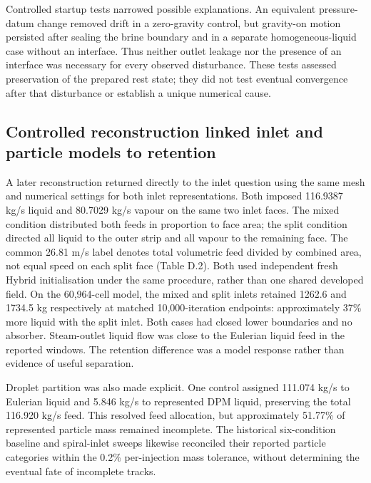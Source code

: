 Controlled startup tests narrowed possible explanations. An equivalent pressure-datum change removed drift in a zero-gravity control, but gravity-on motion persisted after sealing the brine boundary and in a separate homogeneous-liquid case without an interface. Thus neither outlet leakage nor the presence of an interface was necessary for every observed disturbance. These tests assessed preservation of the prepared rest state; they did not test eventual convergence after that disturbance or establish a unique numerical cause.

\subsection{Controlled reconstruction linked inlet and particle models to retention}

A later reconstruction returned directly to the inlet question using the same mesh and numerical settings for both inlet representations. Both imposed 116.9387 kg/s liquid and 80.7029 kg/s vapour on the same two inlet faces. The mixed condition distributed both feeds in proportion to face area; the split condition directed all liquid to the outer strip and all vapour to the remaining face. The common 26.81 m/s label denotes total volumetric feed divided by combined area, not equal speed on each split face (Table D.2). Both used independent fresh Hybrid initialisation under the same procedure, rather than one shared developed field. On the 60,964-cell model, the mixed and split inlets retained 1262.6 and 1734.5 kg respectively at matched 10,000-iteration endpoints: approximately 37\% more liquid with the split inlet. Both cases had closed lower boundaries and no absorber. Steam-outlet liquid flow was close to the Eulerian liquid feed in the reported windows. The retention difference was a model response rather than evidence of useful separation.

Droplet partition was also made explicit. One control assigned 111.074 kg/s to Eulerian liquid and 5.846 kg/s to represented DPM liquid, preserving the total 116.920 kg/s feed. This resolved feed allocation, but approximately 51.77\% of represented particle mass remained incomplete. The historical six-condition baseline and spiral-inlet sweeps likewise reconciled their reported particle categories within the 0.2\% per-injection mass tolerance, without determining the eventual fate of incomplete tracks.

